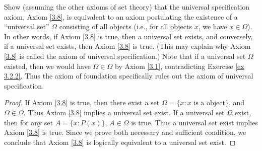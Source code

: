 \begin{exercise}\label{ex 3.2.3}
Show (assuming the other axioms of set theory) that the universal specification axiom, Axiom \ref{3.8}, is equivalent to an axiom postulating the existence of a ``universal set'' \(\Omega\) consisting of all objects (i.e., for all objects \(x\), we have \(x \in \Omega\)).
In other words, if Axiom \ref{3.8} is true, then a universal set exists, and conversely, if a universal set exists, then Axiom \ref{3.8} is true.
(This may explain why Axiom \ref{3.8} is called the axiom of universal specification.)
Note that if a universal set \(\Omega\) existed, then we would have \(\Omega \in \Omega\) by Axiom \ref{3.1}, contradicting Exercise \ref{ex 3.2.2}.
Thus the axiom of foundation specifically rules out the axiom of universal specification.
\end{exercise}

\begin{proof}
If Axiom \ref{3.8} is true, then there exist a set \(\Omega = \{x: x \text{ is a object}\}\), and \(\Omega \in \Omega\).
Thus Axiom \ref{3.8} implies a universal set exist.
If a universal set \(\Omega\) exist, then for any set \(A = \{x: P(x)\}\), \(A \in \Omega\) is true.
Thus a universal set exist implies Axiom \ref{3.8} is true.
Since we prove both necessary and sufficient condition, we conclude that Axiom \ref{3.8} is logically equivalent to a universal set exist.
\end{proof}